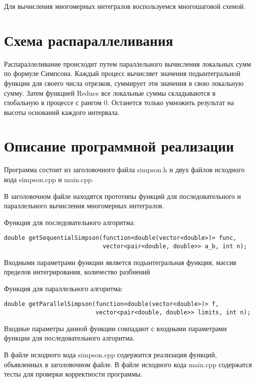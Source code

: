 \documentclass{report}
\begin{document}
\par Для вычисления многомерных интегралов воспользуемся многошаговой схемой.
\newpage

\section*{Схема распараллеливания}
\par 
Распараллеливание происходит путем параллельного вычисления локальных сумм по формуле Симпсона. Каждый процесс вычисляет значения подынтегральной функции для своего числа отрезков, суммирует эти значения в свою локальную сумму. Затем функцией Reduce все локальные суммы складываются в глобальную в процессе с рангом 0. Останется только умножить результат на высоты оснований каждого интервала.
\newpage

\section*{Описание программной реализации}
Программа состоит из заголовочного файла simpson.h и двух файлов исходного кода simpson.cpp и main.cpp.
\par В заголовочном файле находятся прототипы функций для последовательного и параллельного вычисления многомерных интегралов.
\par Функция для последовательного алгоритма:
\begin{lstlisting}
double getSequentialSimpson(function<double(vector<double>)> func,
                            vector<pair<double, double>> a_b, int n);
\end{lstlisting}
Входными параметрами функции является подынтегральная функция, массив пределов интегрирования, количество разбиений
\par Функция для параллельного
алгоритма:
\begin{lstlisting}
double getParallelSimpson(function<double(vector<double>)> f,
                          vector<pair<double, double>> limits, int n);
\end{lstlisting}
Входные параметры данной функции совпадают с входными параметрами функции для последовательного алгоритма.
\par В файле исходного кода simpson.cpp содержится реализация функций, объявленных в заголовочном файле. В файле исходного кода main.cpp содержатся тесты для проверки корректности программы.
\newpage
\end{document}
